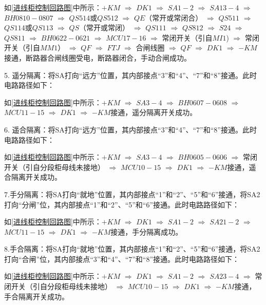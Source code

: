 如\ref{进线柜控制回路图}中所示：$+KM$  $\Longrightarrow $    $DK1$  $\Longrightarrow $    $SA1-2$  $\Longrightarrow $    $SA13-4$  $\Longrightarrow $    $BH0810-0807$  $\Longrightarrow $    $QS514$或$QS512$  $\Longrightarrow $    $QE$（常开或常闭合）  $\Longrightarrow $    $QS511$  $\Longrightarrow $    $QS114$或$QS113$  $\Longrightarrow $    $QS$（常开或常闭）  $\Longrightarrow $    $QS111$  $\Longrightarrow $    $QS812$  $\Longrightarrow $    $S24$  $\Longrightarrow $    $QS811$  $\Longrightarrow $    $BH0622-0621$  $\Longrightarrow $    $MCU17-16$  $\Longrightarrow $    常闭开关（引自$MI1$)  $\Longrightarrow $    常闭开关（引自$MM1$）  $\Longrightarrow $    $QF$  $\Longrightarrow $    $FTJ$  $\Longrightarrow $    合闸线圈  $\Longrightarrow $    $QF$  $\Longrightarrow $    $DK1$  $\Longrightarrow $    $-KM$接通，断路器合闸线圈受电，断路器闭合，手动合闸成功。

5. 遥分隔离：将SA打向“远方”位置，其内部接点“3”和“4”、“7”和“8”接通。此时电路路径如下：

如\ref{进线柜控制回路图}中所示：$+KM$  $\Longrightarrow $    $SA3-4$  $\Longrightarrow $    $BH0607-0608$  $\Longrightarrow $    $MCU11-15$  $\Longrightarrow $    $DK1$  $\Longrightarrow $    $-KM$接通，遥分隔离开关成功。

6. 遥合隔离：将SA打向“远方”位置，其内部接点“3”和“4”、“7”和“8”接通。此时电路路径如下：

如\ref{进线柜控制回路图}中所示：$+KM$  $\Longrightarrow $    $SA3-4$  $\Longrightarrow $    $BH0605-0606$  $\Longrightarrow $    常闭开关（引自分段柜母线未接地）  $\Longrightarrow $    $MCU10-15$  $\Longrightarrow $    $DK1$  $\Longrightarrow $    $-KM$接通，遥合隔离开关成功。

7.手分隔离：将SA打向“就地”位置，其内部接点“1”和“2”、“5”和“6”接通，将SA2打向“分闸”位，其内部接点“1”和“2”、“5”和“6”接通。此时电路路径如下：

如\ref{进线柜控制回路图}中所示：$+KM$  $\Longrightarrow $    $DK1$  $\Longrightarrow $    $SA1-2$  $\Longrightarrow $    $SA21-2$  $\Longrightarrow $    $MCU11-15$  $\Longrightarrow $    $DK1$  $\Longrightarrow $    $-KM$接通，手分隔离成功。

8.手合隔离：将SA打向“就地”位置，其内部接点“1”和“2”、“5”和“6”接通，将SA2打向“合闸”位，其内部接点“3”和“4”、“7”和“8”接通。此时电路路径如下：

如\ref{进线柜控制回路图}中所示：$+KM$  $\Longrightarrow $    $DK1$  $\Longrightarrow $    $SA1-2$  $\Longrightarrow $    $SA23-4$  $\Longrightarrow $    常闭开关（引自分段柜母线未接地）  $\Longrightarrow $    $MCU10-15$  $\Longrightarrow $    $DK1$  $\Longrightarrow $    $-KM$接通，手合隔离开关成功。

